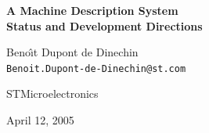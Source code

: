 \documentclass[a4]{seminar}
\begin{document}
\thispagestyle{empty}

\begin{slide}

\begin{center}

{\large\bf A Machine Description System \\
Status and Development Directions}

\vspace{15 mm}

{Beno\^{\i}t Dupont de Dinechin \\
\texttt{Benoit.Dupont-de-Dinechin@st.com}}

\vspace{5 mm}

 {STMicroelectronics}

{\small April 12, 2005}

\end{center}

\end{slide}


\pagestyle{fancy}
\end{document}
